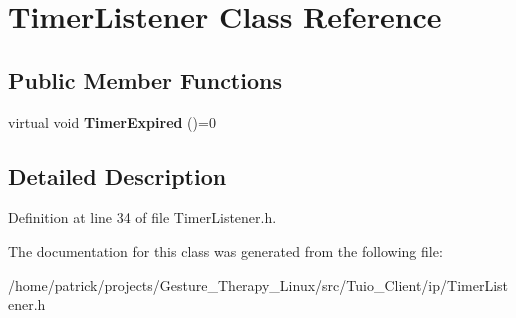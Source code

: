 \hypertarget{class_timer_listener}{}\section{Timer\+Listener Class Reference}
\label{class_timer_listener}
\subsection*{Public Member Functions}
\begin{DoxyCompactItemize}
\item 
\mbox{\label{class_timer_listener_a8b54a33094f0c3ab9324581246c58166}} 
virtual void {\bfseries Timer\+Expired} ()=0
\end{DoxyCompactItemize}


\subsection{Detailed Description}


Definition at line 34 of file Timer\+Listener.\+h.



The documentation for this class was generated from the following file\+:\begin{DoxyCompactItemize}
\item 
/home/patrick/projects/\+Gesture\+\_\+\+Therapy\+\_\+\+Linux/src/\+Tuio\+\_\+\+Client/ip/Timer\+Listener.\+h\end{DoxyCompactItemize}
